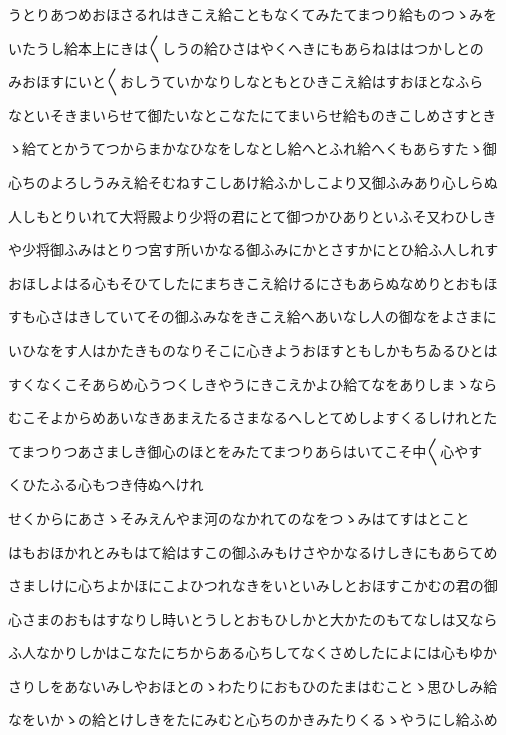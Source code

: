 \documentclass[a4paper,11pt,landscape]{ltjtarticle}
\begin{document}
うとりあつめおほさるれはきこえ給こともなくてみたてまつり給ものつゝみを
\par\medskip
いたうし給本上にきは〱しうの給ひさはやくへきにもあらねははつかしとの
\par\medskip
みおほすにいと〱おしうていかなりしなともとひきこえ給はすおほとなふら
\par\medskip
なといそきまいらせて御たいなとこなたにてまいらせ給ものきこしめさすとき
\par\medskip
ゝ給てとかうてつからまかなひなをしなとし給へとふれ給へくもあらすたゝ御
\par\medskip
心ちのよろしうみえ給そむねすこしあけ給ふかしこより又御ふみあり心しらぬ
\par\medskip
人しもとりいれて大将殿より少将の君にとて御つかひありといふそ又わひしき
\par\medskip
や少将御ふみはとりつ宮す所いかなる御ふみにかとさすかにとひ給ふ人しれす
\par\medskip
おほしよはる心もそひてしたにまちきこえ給けるにさもあらぬなめりとおもほ
\par\medskip
すも心さはきしていてその御ふみなをきこえ給へあいなし人の御なをよさまに
\par\medskip
いひなをす人はかたきものなりそこに心きようおほすともしかもちゐるひとは
\par\medskip
すくなくこそあらめ心うつくしきやうにきこえかよひ給てなをありしまゝなら
\par\medskip
むこそよからめあいなきあまえたるさまなるへしとてめしよすくるしけれとた
\par\medskip
てまつりつあさましき御心のほとをみたてまつりあらはいてこそ中〱心やす
\par\medskip
くひたふる心もつき侍ぬへけれ
\par\medskip
せくからにあさゝそみえんやま河のなかれてのなをつゝみはてすはとこと
\par\medskip
はもおほかれとみもはて給はすこの御ふみもけさやかなるけしきにもあらてめ
\par\medskip
さましけに心ちよかほにこよひつれなきをいといみしとおほすこかむの君の御
\par\medskip
心さまのおもはすなりし時いとうしとおもひしかと大かたのもてなしは又なら
\par\medskip
ふ人なかりしかはこなたにちからある心ちしてなくさめしたによには心もゆか
\par\medskip
さりしをあないみしやおほとのゝわたりにおもひのたまはむことゝ思ひしみ給
\par\medskip
なをいかゝの給とけしきをたにみむと心ちのかきみたりくるゝやうにし給ふめ
\end{document}
